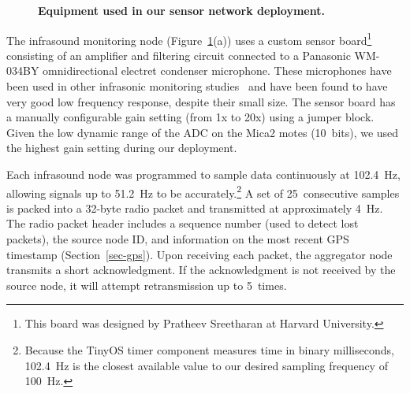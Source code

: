 \begin{figure}[t]
{}
\caption{\small {\bf Equipment used in our sensor network deployment.}}
\label{fig-infrasound}
\end{figure}

The infrasound monitoring node (Figure~\ref{fig-infrasound}(a)) 
uses a custom sensor board\footnote{This board was designed by 
Pratheev Sreetharan at Harvard University.}
consisting of an
amplifier and filtering circuit connected to a Panasonic WM-034BY
omnidirectional electret condenser microphone. These microphones have 
been used in other infrasonic monitoring studies~\cite{Johnson04}
and have been found to have very good low frequency response, despite
their small size. The sensor board has a manually configurable gain
setting (from 1x to 20x) using a jumper block. Given the low dynamic
range of the ADC on the Mica2 motes (10~bits), we used the highest
gain setting during our deployment. 


Each infrasound node was programmed to sample data continuously at
102.4~Hz, allowing signals up to 51.2~Hz to be 
accurately.\footnote{Because the TinyOS timer component measures time in
binary milliseconds, 102.4~Hz is
the closest available value to our desired sampling frequency of 100~Hz.}
A set of 25~consecutive samples is packed into a 32-byte radio packet
and transmitted at approximately 4~Hz. The radio packet
header includes a sequence number (used to detect lost packets), the 
source node ID, and information on the most recent GPS timestamp 
(Section~\ref{sec-gps}). Upon receiving each packet, the aggregator
node transmits a short acknowledgment. If the acknowledgment is not
received by the source node, it will attempt retransmission 
up to 5~times.

